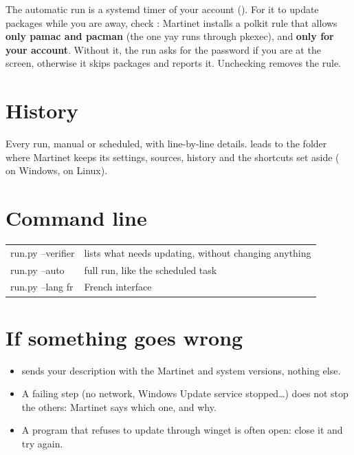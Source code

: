
The automatic run is a systemd timer of your account ().
For it to update packages while you are away, check :
Martinet installs a polkit rule that allows \textbf{only pamac and pacman} (the one yay runs through
pkexec), and \textbf{only for your account}.
Without it, the run asks for the password if you are at the screen, otherwise it skips packages and
reports it. Unchecking removes the rule.

\section{History}


Every run, manual or scheduled, with line-by-line details.  leads to
the folder where Martinet keeps its settings, sources, history and the shortcuts set aside
( on Windows,  on Linux).

\section{Command line}

\begin{center}
\begin{tabular}{>{\ttfamily}l l}
\toprule
run.py --verifier & lists what needs updating, without changing anything \\
run.py --auto & full run, like the scheduled task \\
run.py --lang fr & French interface \\
\bottomrule
\end{tabular}
\end{center}

\section{If something goes wrong}

\begin{itemize}
\item {} sends your description with the Martinet and system versions,
nothing else.
\item A failing step (no network, Windows Update service stopped…) does not stop the others: Martinet
says which one, and why.
\item A program that refuses to update through winget is often open: close it and try again.
\end{itemize}


